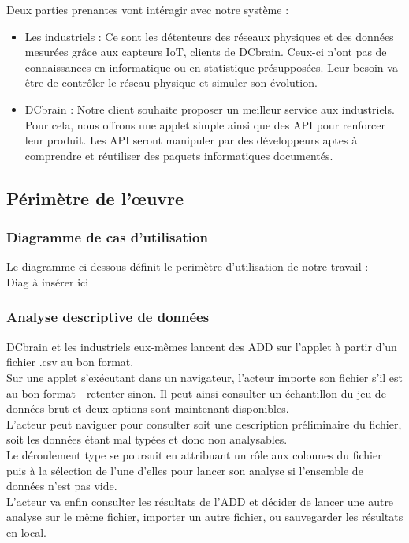 			Deux parties prenantes vont intéragir avec notre système :\\
			\begin{itemize}
			\item Les industriels : Ce sont les détenteurs des réseaux physiques et des données mesurées grâce aux capteurs IoT, clients de DCbrain. Ceux-ci n'ont pas de connaissances en informatique ou en statistique présupposées. Leur besoin va être de contrôler le réseau physique et simuler son évolution.\\
			\item DCbrain : Notre client souhaite proposer un meilleur service aux industriels. Pour cela, nous offrons une applet simple ainsi que des API pour renforcer leur produit. Les API seront manipuler par des développeurs aptes à comprendre et réutiliser des paquets informatiques documentés.
			\end{itemize}
				
		\subsection{Périmètre de l'œuvre}
		
			\subsubsection{Diagramme de cas d'utilisation}
				Le diagramme ci-dessous définit le perimètre d'utilisation de notre travail :\\
					{\color{red} Diag à insérer ici}
				
			\subsubsection{Analyse descriptive de données}
				DCbrain et les industriels eux-mêmes lancent des ADD sur l'applet à partir d'un fichier .csv au bon format.\\
				Sur une applet s'exécutant dans un navigateur, l'acteur importe son fichier s'il est au bon format - retenter sinon. Il peut ainsi consulter un échantillon du jeu de données brut et deux options sont maintenant disponibles.\\
				L'acteur peut naviguer pour consulter soit une description préliminaire du fichier, soit les données étant mal typées et donc non analysables.\\
				Le déroulement type se poursuit en attribuant un rôle aux colonnes du fichier puis à la sélection de l'une d'elles pour lancer son analyse si l'ensemble de données n'est pas vide.\\
				L'acteur va enfin consulter les résultats de l'ADD et décider de lancer une autre analyse sur le même fichier, importer un autre fichier, ou sauvegarder les résultats en local.
				
